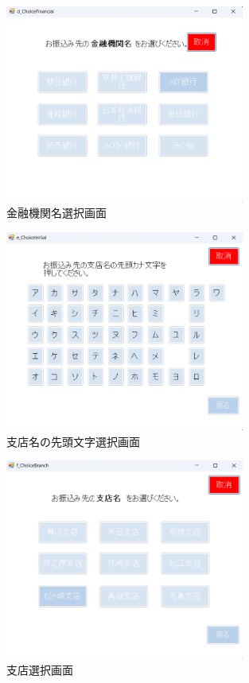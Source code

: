 \documentclass{jlreq}
\numberwithin{equation}{section}
\begin{document}
\begin{figure}[H]
  \centering
  \includegraphics[width=0.7\textwidth]{image/d_ChoiceFinancial.png}
  \caption{金融機関名選択画面}
  \label{fig:d_ChoiceFinancial}
\end{figure}
\begin{figure}[H]
  \centering
  \includegraphics[width=0.7\textwidth]{image/e_ChoiceInitial.png}
  \caption{支店名の先頭文字選択画面}
  \label{fig:e_ChoiceInitial}
\end{figure}
\begin{figure}[H]
  \centering
  \includegraphics[width=0.7\textwidth]{image/f_ChoiceBranch.png}
  \caption{支店選択画面}
  \label{fig:f_ChoiceBranch}
\end{figure}
\end{document}
